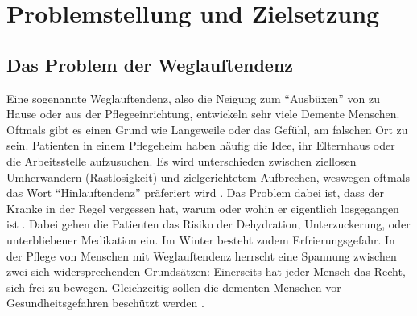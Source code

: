 \section{Problemstellung und Zielsetzung}\label{sec:definitionen}
\subsection{Das Problem der Weglauftendenz}\label{ssec:weglauftendenz}
Eine sogenannte Weglauftendenz, also die Neigung zum \enquote{Ausbüxen} von zu Hause oder aus der Pflegeeinrichtung, entwickeln sehr viele Demente Menschen. Oftmals gibt es einen Grund wie Langeweile oder das Gefühl, am falschen Ort zu sein. Patienten in einem Pflegeheim haben häufig die Idee, ihr Elternhaus oder die Arbeitsstelle aufzusuchen. Es wird unterschieden zwischen ziellosen Umherwandern (Rastlosigkeit) und zielgerichtetem Aufbrechen, weswegen oftmals das Wort \enquote{Hinlauftendenz} präferiert wird \citep[Vgl.][]{hinlauf}. Das Problem dabei ist, dass der Kranke in der Regel vergessen hat, warum oder wohin er eigentlich losgegangen ist \citep[Vgl.][]{dgk}. Dabei gehen die Patienten das Risiko der Dehydration, Unterzuckerung, oder unterbliebener Medikation ein. Im Winter besteht zudem Erfrierungsgefahr. In der Pflege von Menschen mit Weglauftendenz herrscht eine Spannung zwischen zwei sich widersprechenden Grundsätzen: Einerseits hat jeder Mensch das Recht, sich frei zu bewegen. Gleichzeitig sollen die dementen Menschen vor Gesundheitsgefahren beschützt werden \citep[Vgl.][]{pqsg}.

